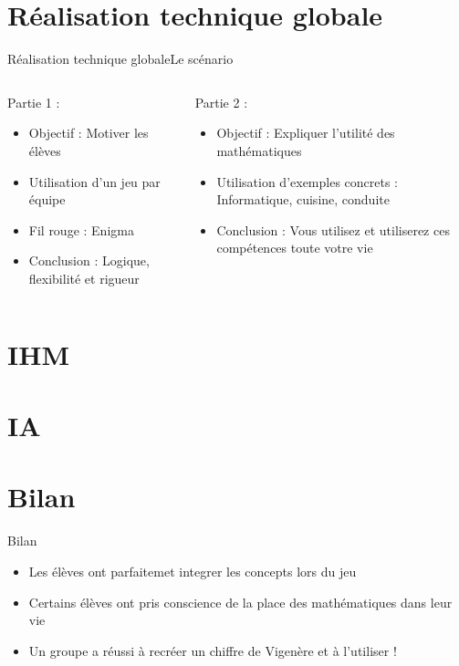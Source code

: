 \documentclass{beamer}
\begin{document}
\section{Réalisation technique globale}
\begin{frame}{Réalisation technique globale}{Le scénario}

\begin{columns}

\begin{column}{4cm}
	Partie 1 :
	\begin{itemize}
		\item Objectif : Motiver les élèves
		\item Utilisation d'un jeu par équipe
		\item Fil rouge : Enigma
		\item Conclusion : Logique, flexibilité et rigueur
	\end{itemize}
\end{column}

\begin{column}{6cm}
	Partie 2 :
	\begin{itemize}
		\item Objectif : Expliquer l'utilité des mathématiques
		\item Utilisation d'exemples concrets : Informatique, cuisine, conduite
		\item Conclusion : Vous utilisez et utiliserez ces compétences toute votre vie
	\end{itemize}
\end{column}

\end{columns}

\end{frame}

\section{IHM}

\section{IA}


\section{Bilan}

\begin{frame}{Bilan}

  \begin{itemize}
  \item Les élèves ont parfaitemet integrer les concepts lors du jeu
  \item Certains élèves ont pris conscience de la place des mathématiques dans leur vie
  \item Un groupe a réussi à recréer un chiffre de Vigenère et à l'utiliser !
  \end{itemize}
  
 
\end{frame}
\end{document}

